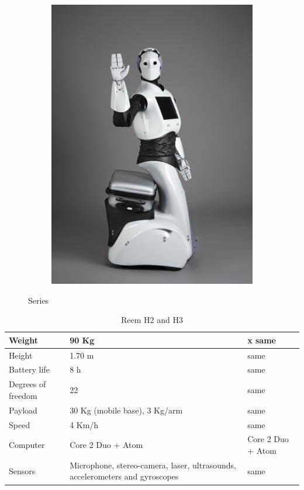 \begin{figure}
\begin{subfigure}[b]{0.3\textwidth}
           \includegraphics[width=\textwidth]{figures/reemh3}
           \caption{}
           \label{fig:tiger}
       \end{subfigure}
       \caption{\reem Series}
       \label{fig:reemseries}
\end{figure}

\begin{table}[ht]
    \centering
    \begin{tabularx}{\linewidth}{| X | X | X |}
    \hline
    Weight & 90 Kg & x same\\ \hline
    Height & 1.70 m & same \\ \hline
    Battery life & 8 h & same \\ \hline
    Degrees of freedom & 22 & same \\ \hline
    Payload & 30 Kg (mobile base), 3 Kg/arm & same\\ \hline
    Speed & 4 Km/h & same\\ \hline
    Computer & Core 2 Duo + Atom & Core 2 Duo + Atom \\ \hline
    Sensors & Microphone, stereo-camera, laser, ultrasounds, accelerometers and gyroscopes & same \\
    \hline
    \end{tabularx}
    \caption{Reem H2 and H3}
    \label{tab:rh2}
\end{table}


